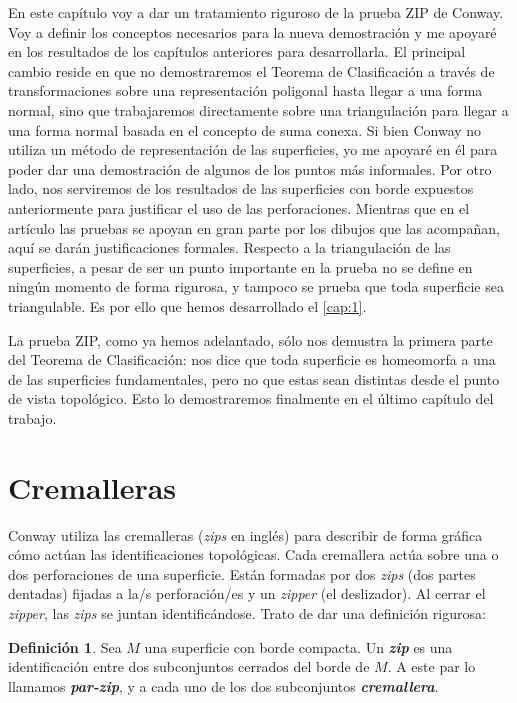 \documentclass[10pt]{report}
\newcommand{\enfatiza}[1]{\textbf{\textit{#1}}}
\theoremstyle{definition}
\newtheorem{defin}{Definición}[section]
\begin{document}
En este capítulo voy a dar un tratamiento riguroso de la prueba ZIP de Conway. Voy a definir los conceptos necesarios para la nueva demostración y me apoyaré en los resultados de los capítulos anteriores para desarrollarla. El principal cambio reside en que no demostraremos el Teorema de Clasificación a través de transformaciones sobre una representación poligonal hasta llegar a una forma normal, sino que trabajaremos directamente sobre una triangulación para llegar a una forma normal basada en el concepto de suma conexa. Si bien Conway no utiliza un método de representación de las superficies, yo me apoyaré en él para poder dar una demostración de algunos de los puntos más informales. Por otro lado, nos serviremos de los resultados de las superficies con borde expuestos anteriormente para justificar el uso de las perforaciones. Mientras que en el artículo \cite{zip} las pruebas se apoyan en gran parte por los dibujos que las acompañan, aquí se darán justificaciones formales.
Respecto a la triangulación de las superficies, a pesar de ser un punto importante en la prueba no se define en ningún momento de forma rigurosa, y tampoco se prueba que toda superficie sea triangulable. Es por ello que hemos desarrollado el \autoref{cap:1}.

La prueba ZIP, como ya hemos adelantado, sólo nos demustra la primera parte del Teorema de Clasificación: nos dice que toda superficie es homeomorfa a una de las superficies fundamentales, pero no que estas sean distintas desde el punto de vista topológico. Esto lo demostraremos finalmente en el último capítulo del trabajo.

\section{Cremalleras}


Conway utiliza las cremalleras (\textit{zips} en inglés) para describir de forma gráfica cómo actúan las identificaciones topológicas. Cada cremallera actúa sobre una o dos perforaciones de una superficie. Están formadas por dos \textit{zips} (dos partes dentadas) fijadas a la/s perforación/es y un \textit{zipper} (el deslizador). Al cerrar el \textit{zipper}, las \textit{zips} se juntan identificándose. Trato de dar una definición rigurosa:


\begin{defin}%
Sea $M$ una superficie con borde compacta. Un \enfatiza{zip} es una identificación entre dos subconjuntos cerrados del borde de $M$. A este par lo llamamos \enfatiza{par-zip}, y a cada uno de los dos subconjuntos \enfatiza{cremallera}.
\end{defin}
\end{document}
